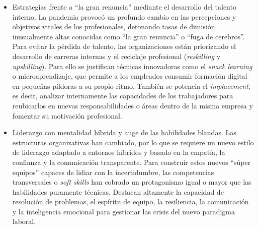 \documentclass[12pt]{book} %
\begin{document}
\begin{enumerate}
\begin{itemize}
        \item Estrategias frente a ``la gran renuncia'' mediante el desarrollo del talento interno. La pandemia provocó un profundo cambio en las percepciones y objetivos vitales de los profesionales, detonando tasas de dimisión inusualmente altas conocidas como ``la gran renuncia'' o ``fuga de cerebros''. Para evitar la pérdida de talento, las organizaciones están priorizando el desarrollo de carreras internas y el reciclaje profesional (\textit{reskilling} y \textit{upskilling}). Para ello se justifican técnicas innovadoras como el \textit{snack learning} o microaprendizaje, que permite a los empleados consumir formación digital en pequeñas píldoras a su propio ritmo. También se potencia el \textit{implacement}, es decir, analizar internamente las capacidades de los trabajadores para reubicarlos en nuevas responsabilidades o áreas dentro de la misma empresa y fomentar su motivación profesional.
        
        \item Liderazgo con mentalidad híbrida y auge de las habilidades blandas. Las estructuras organizativas han cambiado, por lo que se requiere un nuevo estilo de liderazgo adaptado a entornos híbridos y basado en la empatía, la confianza y la comunicación transparente. Para construir estos nuevos ``súper equipos'' capaces de lidiar con la incertidumbre, las competencias transversales o \textit{soft skills} han cobrado un protagonismo igual o mayor que las habilidades puramente técnicas. Destacan altamente la capacidad de resolución de problemas, el espíritu de equipo, la resiliencia, la comunicación y la inteligencia emocional para gestionar las crisis del nuevo paradigma laboral.
    \end{itemize}
\end{enumerate}
\end{document}
